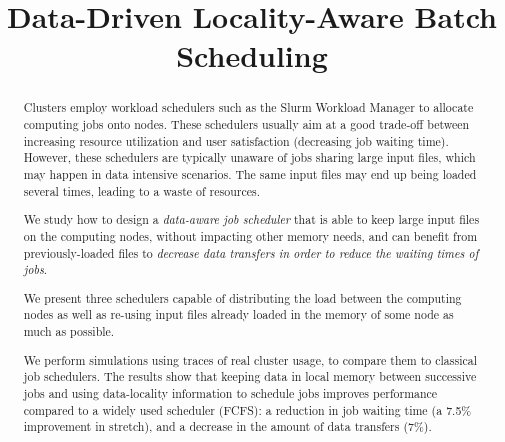 \documentclass[conference]{IEEEtran}
\begin{document}
\title{Data-Driven Locality-Aware Batch Scheduling}

\author{
\and
{}
\and
{}
\and
{}
\and
{}
}

\maketitle

\begin{abstract}
  Clusters employ workload schedulers such as
  the Slurm Workload Manager to allocate computing jobs onto
  nodes. These schedulers usually aim at a good trade-off between
  increasing resource utilization and user satisfaction (decreasing
  job waiting time). However, these schedulers are typically unaware
  of jobs sharing large input files, which may happen in data
  intensive scenarios. The same input files may end up being loaded several
  times, leading to a waste of resources.
   
  We study how to design a \textit{data-aware job scheduler} that is
  able to keep large input files on the computing nodes, without
  impacting other memory needs, and can benefit from previously-loaded files to
  \textit{decrease data transfers in order to reduce the waiting times of jobs}.

  We present three schedulers capable of distributing the load between
  the computing nodes as well as re-using input files already loaded
  in the memory of some node as much as possible.
  
  We perform simulations using traces of real cluster usage, to compare
  them to classical job schedulers. The results show that
  keeping data in local memory between successive jobs and using data-locality
  information to schedule jobs improves performance compared
  to a widely used scheduler (FCFS): a reduction in job waiting time
  (a 7.5\% improvement in stretch), and a decrease in the
  amount of data transfers (7\%).

\end{abstract}
\end{document}
